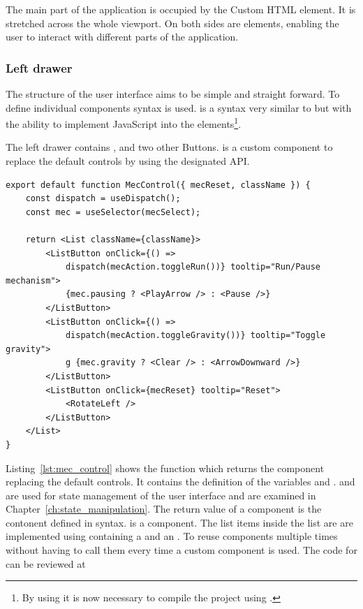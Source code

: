 The main part of the application is occupied by the  Custom HTML element.
It is stretched across the whole viewport.
On both sides are   elements, enabling the user to interact with different parts of the application.

\subsubsection{Left drawer}

The structure of the user interface aims to be simple and straight forward.
To define individual components   syntax is used.
 is a syntax very similar to  but with the ability to implement JavaScript into the elements\footnote{By using  it is now necessary to compile the project using .}. %

The left drawer contains ,  and two other Buttons.
 is a custom  component to replace the default  controls by using the designated API.\@

\begin{lstlisting}[label={lst:mec_control}, caption={Definition of the \name{MecControl} component.}]
export default function MecControl({ mecReset, className }) {
    const dispatch = useDispatch();
    const mec = useSelector(mecSelect);

    return <List className={className}>
        <ListButton onClick={() =>
            dispatch(mecAction.toggleRun())} tooltip="Run/Pause mechanism">
            {mec.pausing ? <PlayArrow /> : <Pause />}
        </ListButton>
        <ListButton onClick={() =>
            dispatch(mecAction.toggleGravity())} tooltip="Toggle gravity">
            g {mec.gravity ? <Clear /> : <ArrowDownward />}
        </ListButton>
        <ListButton onClick={mecReset} tooltip="Reset">
            <RotateLeft />
        </ListButton>
    </List>
}
\end{lstlisting}

Listing~\ref{lst:mec_control} shows the function which returns the component replacing the default  controls.
It contains the definition of the variables  and .
 and  are used for state management of the user interface and are examined in Chapter~\ref{ch:state_manipulation}.
The return value of a component is the contonent defined in  syntax.
 is a  component.
The list items inside the list are are implemented using  containing a  and an .
To reuse  components multiple times without having to call them every time a custom  component is used.
The code for  can be reviewed at \aka{} %


